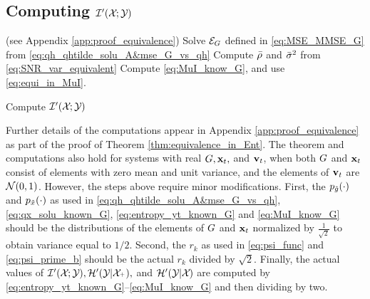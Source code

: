 \documentclass[12pt, draftclsnofoot,journal,onecolumn]{IEEEtran}
\begin{document}
\subsection{Computing $\cIInn{\txA}{\rxA}{}$}
\label{sec:step_by_step_computation}
\begin{Process}[H]
\SetAlgoLined
\nonl{}
 (see Appendix \ref{app:proof_equivalence})\;
\nonl\algorithmicensure{ $\cIInn{\txA}{\rxA}{}$ \eqref{eq:MuI_def_high}%
}\;
Solve ${\mathcal{E}}_{G}$ defined in \eqref{eq:MSE_MMSE_G} from \eqref{eq:qh_qhtilde_solu_A&mse_G_vs_qh}\;
Compute $\bar{\rho}$ and $\bar{\sigma}_{}^2$ from \eqref{eq:SNR_var_equivalent}\;
Compute \eqref{eq:MuI_know_G}, and use \eqref{eq:equi_in_MuI}.
 \caption{Compute $\cIInn{\txA}{\rxA}{}$}
\end{Process}

Further details of the computations appear in Appendix \ref{app:proof_equivalence} as part of the proof of Theorem \ref{thm:equivalence_in_Ent}.
The theorem and computations also hold for systems with real $G,{\mathbf{x}}_t,$ and ${\mathbf{v}}_t$, when both $G$ and ${\mathbf{x}}_t$ consist of \iid elements with zero mean and unit variance, and the elements of ${\mathbf{v}}_t$ are \iid $\mathcal{N}(0,1)$.   However, the steps above require minor modifications. First, the $p_{\tilde{g}}(\cdot)$ and $p_{\tilde{x}}(\cdot)$ as used in  \eqref{eq:qh_qhtilde_solu_A&mse_G_vs_qh}, \eqref{eq:qx_solu_known_G}, \eqref{eq:entropy_yt_known_G} and \eqref{eq:MuI_know_G} should be the distributions of the elements of $G$ and ${\mathbf{x}}_t$ normalized by $\frac{1}{\sqrt{2}}$ to obtain variance equal to $1/2$. Second, the $r_k$ as used in \eqref{eq:psi_func} and \eqref{eq:psi_prime_b} should be the actual $r_k$ divided by $\sqrt{2}$. 
Finally, the actual values of $\mathcal{I}{'}({\mathcal{X}}_{};{\mathcal{Y}}_{}), {\mathcal{H}{'}}({\mathcal{Y}}_{}|{\mathcal{X}}_{ ^+}),$ and ${\mathcal{H}{'}}({\mathcal{Y}}_{}|{\mathcal{X}}_{})$ are computed by \eqref{eq:entropy_yt_known_G}--\eqref{eq:MuI_know_G} and then dividing by two.
\end{document}
